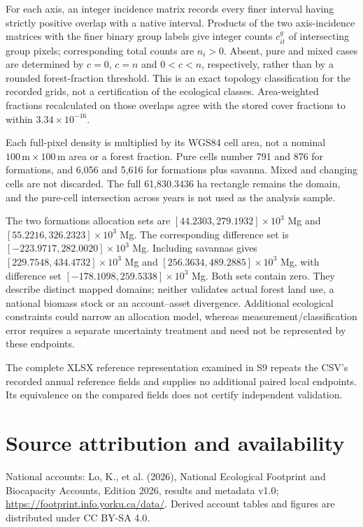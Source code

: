 \documentclass[11pt,a4paper]{article}
\begin{document}
For each axis, an integer incidence matrix records every finer interval having strictly positive overlap with a native interval. Products of the two axis-incidence matrices with the finer binary group labels give integer counts $c_{it}^g$ of intersecting group pixels; corresponding total counts are $n_i>0$. Absent, pure and mixed cases are determined by $c=0$, $c=n$ and $0<c<n$, respectively, rather than by a rounded forest-fraction threshold. This is an exact topology classification for the recorded grids, not a certification of the ecological classes. Area-weighted fractions recalculated on those overlaps agree with the stored cover fractions to within $3.34\times10^{-16}$.

Each full-pixel density is multiplied by its WGS84 cell area, not a nominal $100\,\mathrm m\times100\,\mathrm m$ area or a forest fraction. Pure cells number 791 and 876 for formations, and 6,056 and 5,616 for formations plus savanna. Mixed and changing cells are not discarded. The full 61,830.3436 ha rectangle remains the domain, and the pure-cell intersection across years is not used as the analysis sample.

The two formations allocation sets are $[44.2303,279.1932]\times10^3$ Mg and $[55.2216,326.2323]\times10^3$ Mg. The corresponding difference set is $[-223.9717,282.0020]\times10^3$ Mg. Including savannas gives $[229.7548,434.4732]\times10^3$ Mg and $[256.3634,489.2885]\times10^3$ Mg, with difference set $[-178.1098,259.5338]\times10^3$ Mg. Both sets contain zero. They describe distinct mapped domains; neither validates actual forest land use, a national biomass stock or an account--asset divergence. Additional ecological constraints could narrow an allocation model, whereas measurement/classification error requires a separate uncertainty treatment and need not be represented by these endpoints.

The complete XLSX reference representation examined in S9 repeats the CSV's recorded annual reference fields and supplies no additional paired local endpoints. Its equivalence on the compared fields does not certify independent validation.

\section*{Source attribution and availability}

National accounts: Lo, K., et al. (2026), National Ecological Footprint and Biocapacity Accounts, Edition 2026, results and metadata v1.0; \url{https://footprint.info.yorku.ca/data/}. Derived account tables and figures are distributed under CC BY-SA 4.0.
\end{document}
